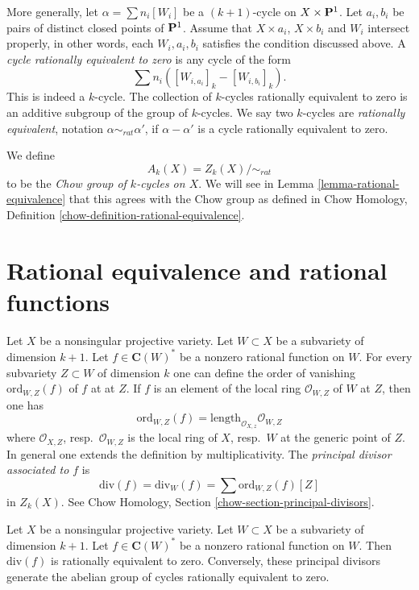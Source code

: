 \medskip\noindent
More generally, let $\alpha = \sum n_i [W_i]$ be a $(k + 1)$-cycle on
$X \times {\bf P}^1$.  Let $a_i, b_i$ be pairs of distinct closed points of
${\bf P}^1$. Assume that $X \times a_i$, $X \times b_i$ and $W_i$ intersect
properly, in other words, each $W_i, a_i, b_i$ satisfies the condition
discussed above. A {\it cycle rationally equivalent to zero} is any cycle
of the form
$$
\sum n_i([W_{i, a_i}]_k - [W_{i, b_i}]_k).
$$
This is indeed a $k$-cycle. The collection of $k$-cycles rationally
equivalent to zero is an additive subgroup of the group of $k$-cycles.
We say two $k$-cycles are {\it rationally equivalent}, notation
$\alpha \sim_{rat} \alpha'$, if $\alpha - \alpha'$ is a cycle rationally
equivalent to zero.

\medskip\noindent
We define
$$
A_k(X) = Z_k(X)/ \sim_{rat}
$$
to be the {\it Chow group of $k$-cycles on $X$}. We will see in
Lemma \ref{lemma-rational-equivalence}
that this agrees with the Chow group as defined in
Chow Homology, Definition \ref{chow-definition-rational-equivalence}.


\section{Rational equivalence and rational functions}
\label{section-alternative}

\noindent
Let $X$ be a nonsingular projective variety. Let $W \subset X$ be a subvariety
of dimension $k + 1$. Let $f \in \mathbf{C}(W)^*$ be a nonzero rational
function on $W$. For every subvariety $Z \subset W$ of dimension $k$
one can define the order of vanishing $\text{ord}_{W, Z}(f)$ of $f$ at
at $Z$. If $f$ is an element of the local ring $\mathcal{O}_{W, Z}$
of $W$ at $Z$, then one has
$$
\text{ord}_{W, Z}(f) = \text{length}_{\mathcal{O}_{X, z}} \mathcal{O}_{W, Z}
$$
where $\mathcal{O}_{X, Z}$, resp.\ $\mathcal{O}_{W, Z}$ is the
local ring of $X$, resp.\ $W$ at the generic point of $Z$. In general one
extends the definition by multiplicativity. The {\it principal divisor
associated to $f$} is
$$
\text{div}(f) = \text{div}_W(f) = \sum \text{ord}_{W, Z}(f)[Z]
$$
in $Z_k(X)$. See Chow Homology, Section \ref{chow-section-principal-divisors}.

\begin{lemma}
\label{lemma-rational-equivalence}
Let $X$ be a nonsingular projective variety. Let $W \subset X$ be a subvariety
of dimension $k + 1$. Let $f \in \mathbf{C}(W)^*$ be a nonzero rational
function on $W$. Then $\text{div}(f)$ is rationally equivalent to zero.
Conversely, these principal divisors generate the abelian group of
cycles rationally equivalent to zero.
\end{lemma}

